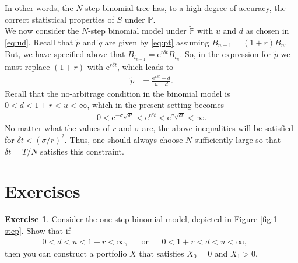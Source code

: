 \documentclass[12pt]{book}
\numberwithin{equation}{chapter}
\theoremstyle{plain}
\numberwithin{theorem}{section}
\theoremstyle{definition}
\newtheorem{exercise}{\underline{Exercise}}
\numberwithin{exercise}{chapter}
\newcommand{\<}{\langle}
\renewcommand{\>}{\rangle}
\renewcommand{\(}{\left(}
\renewcommand{\)}{\right)}
\renewcommand{\[}{\left[}
\renewcommand{\]}{\right]}
\newcommand\Pb{\mathds{P}}
\newcommand\sig{\sigma}
\newcommand\del{\delta}
\newcommand\Pbt{\widetilde{\Pb}}
\newcommand\qt{\widetilde{q}}
\newcommand\ee{\mathrm{e}}
\theoremstyle{definition}
\numberwithin{question}{section}
\newcommand\pt{\widetilde{p}}
\begin{document}
In other words, the $N$-step binomial tree has, to a high degree of accuracy, the correct statistical properties of $S$ under $\Pb$.
\\[0.5em]
We now consider the $N$-step binomial model under $\Pbt$ with $u$ and $d$ as chosen in \eqref{eq:ud}.  Recall that $\pt$ and $\qt$ are given by \eqref{eq:pt} assuming $B_{n+1} = (1+r) B_n$.  But, we have specified above that $B_{t_{n+1}} = \ee^{r \del t} B_{t_n}$.  So, in the expression for $\pt$ we must replace $(1+r)$ with $\ee^{r \del t}$, which leads to
\begin{align}
\pt
	&=	\frac{ \ee^{r \del t} - d}{u - d} .
\end{align}
Recall that the no-arbitrage condition in the binomial model is $0 < d < 1+r < u < \infty$, which in the present setting becomes
\begin{align}
0 < \ee^{- \sig \sqrt{\del t}} < \ee^{r \del t} < \ee^{\sig \sqrt{\del t}} < \infty .
\end{align}
No matter what the values of $r$ and $\sig$ are, the above inequalities will be satisfied for $\del t < (\sig / r)^2$.  Thus, one should always choose $N$ sufficiently large so that $\del t = T/N$ satisfies this constraint.



\section{Exercises}
\label{sec:exer-2}


\begin{exercise}
\label{exer:2-1}
Consider the one-step binomial model, depicted in Figure \ref{fig:1-step}.  Show that if
\begin{align}
0 < d < u < 1+r< \infty , &&
\text{or}&&
0 < 1+r < d < u < \infty ,&&
\end{align} 
then you can construct a portfolio $X$ that satisfies $X_0 = 0$ and $X_1 > 0$.
\end{exercise}

\end{document}
